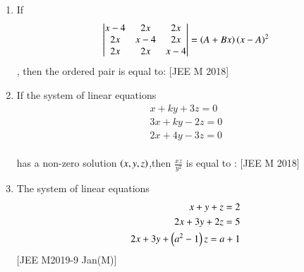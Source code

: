 \documentclass[journal,,12pt,twocolumn]{IEEEtran}
\theoremstyle{remark}
\begin{document}
\begin{enumerate}
\begin{enumerate}
\end{enumerate} 
\item If \begin{align} \begin{vmatrix}
x-4 & 2x  & 2x\\
2x & x-4 & 2x \\
 2x & 2x & x-4 
\end{vmatrix} =\left(A+Bx\right)\left(x-A\right)^2\end{align}, then the ordered pair  is equal to: 
\hfill{[JEE M 2018]}
\begin{enumerate}
\end{enumerate}
\item If the system of linear equations \\
\begin{align}x+ky+3z=0 \\
3x+ky-2z=0 \\
2x+4y-3z=0 \end{align}\\
has a non-zero solution $\left(x,y,z\right)$,then $\frac{xz}{y^2}$ is equal to :
\hfill{[JEE M 2018]}
\begin{enumerate}
\end{enumerate}
\item The system of linear equations \\
\begin{align}x+y+z=2 \\
2x+3y+2z=5 \\
2x+3y+\left(a^2-1\right)z=a+1 \end{align} 
\hfill{[JEE M2019-9 Jan(M)]}
\begin{enumerate}


\end{enumerate}
\end{enumerate}
\end{document}
